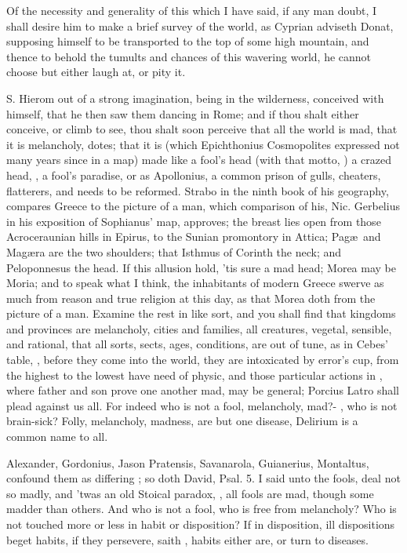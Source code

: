 {Of the necessity and generality of this which I have said, if any man
doubt, I shall desire him to make a brief survey of the world, as 
Cyprian adviseth Donat, supposing himself to be transported to the top
of some high mountain, and thence to behold the tumults and chances of
this wavering world, he cannot choose but either laugh at, or pity it.

S. Hierom out of a strong imagination, being in the wilderness,
conceived with himself, that he then saw them dancing in Rome; and if
thou shalt either conceive, or climb to see, thou shalt soon perceive
that all the world is mad, that it is melancholy, dotes; that it is
(which Epichthonius Cosmopolites expressed not many years since in a
map) made like a fool's head (with that motto, )
a crazed head, , a fool's paradise, or as Apollonius, a
common prison of gulls, cheaters, flatterers, \etc and needs to be
reformed. Strabo in the ninth book of his geography, compares Greece to
the picture of a man, which comparison of his, Nic. Gerbelius in his
exposition of Sophianus' map, approves; the breast lies open from those
Acroceraunian hills in Epirus, to the Sunian promontory in Attica;
Pag\ae{}\ and Mag\ae{}ra are the two shoulders; that Isthmus of Corinth the
neck; and Peloponnesus the head. If this allusion hold, 'tis sure a mad
head; Morea may be Moria; and to speak what I think, the inhabitants of
modern Greece swerve as much from reason and true religion at this day,
as that Morea doth from the picture of a man. Examine the rest in like
sort, and you shall find that kingdoms and provinces are melancholy,
cities and families, all creatures, vegetal, sensible, and rational,
that all sorts, sects, ages, conditions, are out of tune, as in Cebes'
table, , before they come into the world, they are
intoxicated by error's cup, from the highest to the lowest have need of
physic, and those particular actions in \Seneca, where father and
son prove one another mad, may be general; Porcius Latro shall plead
against us all. For indeed who is not a fool, melancholy, mad?-
, who is not brain-sick? Folly, melancholy,
madness, are but one disease, Delirium is a common name to all.

Alexander, Gordonius, Jason Pratensis, Savanarola, Guianerius,
Montaltus, confound them as differing ; so doth
David, Psal.  5. I said unto the fools, deal not so madly, and
'twas an old Stoical paradox, , all fools
are mad, though some madder than others. And who is not a fool, who is
free from melancholy? Who is not touched more or less in habit or
disposition? If in disposition, ill dispositions beget habits, if they
persevere, saith , habits either are, or turn to diseases.

}
